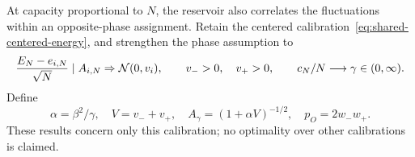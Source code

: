 At capacity proportional to $N$, the reservoir also correlates the
fluctuations within an opposite-phase assignment. Retain the centered
calibration~\eqref{eq:shared-centered-energy}, and strengthen the
phase assumption to
\begin{equation}
 \frac{E_N-e_{i,N}}{\sqrt N}\mid A_{i,N}
       \Rightarrow\mathcal N(0,v_i),\qquad v_->0,\quad v_+>0,
 \qquad c_N/N\longrightarrow\gamma\in(0,\infty).
 \label{eq:shared-linear-assumptions}
\end{equation}
Define
\begin{equation}
 \alpha=\beta^2/\gamma,\quad V=v_-+v_+,\quad
 A_\gamma=(1+\alpha V)^{-1/2},\quad p_O=2w_-w_+.
 \label{eq:shared-linear-constants}
\end{equation}
These results concern only this calibration; no optimality over other
calibrations is claimed.

